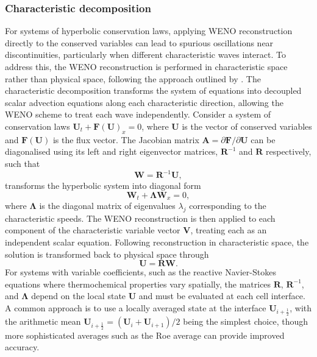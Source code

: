 \subsubsection{Characteristic decomposition}

For systems of hyperbolic conservation laws, applying WENO reconstruction directly to the conserved variables can lead to spurious oscillations near discontinuities, particularly when different characteristic waves interact. To address this, the WENO reconstruction is performed in characteristic space rather than physical space, following the approach outlined by \citet{JiangShu1996}. The characteristic decomposition transforms the system of equations into decoupled scalar advection equations along each characteristic direction, allowing the WENO scheme to treat each wave independently. Consider a system of conservation laws $\mathbf{U}_t + \mathbf{F}(\mathbf{U})_x = 0$, where $\mathbf{U}$ is the vector of conserved variables and $\mathbf{F}(\mathbf{U})$ is the flux vector. The Jacobian matrix $\mathbf{A} = \partial \mathbf{F}/\partial \mathbf{U}$ can be diagonalised using its left and right eigenvector matrices, $\mathbf{R}^{-1}$ and $\mathbf{R}$ respectively, such that
\begin{equation}
\mathbf{W} = \mathbf{R}^{-1}\mathbf{U},
\end{equation}
transforms the hyperbolic system into diagonal form
\begin{equation}
\mathbf{W}_t + \mathbf{\Lambda}\mathbf{W}_x = 0,
\end{equation}
where $\mathbf{\Lambda}$ is the diagonal matrix of eigenvalues $\lambda_j$ corresponding to the characteristic speeds. The WENO reconstruction is then applied to each component of the characteristic variable vector $\mathbf{V}$, treating each as an independent scalar equation. Following reconstruction in characteristic space, the solution is transformed back to physical space through
\begin{equation}
\mathbf{U} = \mathbf{R}\mathbf{W}.
\end{equation}
For systems with variable coefficients, such as the reactive Navier-Stokes equations where thermochemical properties vary spatially, the matrices $\mathbf{R}$, $\mathbf{R}^{-1}$, and $\mathbf{\Lambda}$ depend on the local state $\mathbf{U}$ and must be evaluated at each cell interface. A common approach is to use a locally averaged state at the interface $\mathbf{U}_{i+\frac{1}{2}}$, with the arithmetic mean $\mathbf{U}_{i+\frac{1}{2}} = (\mathbf{U}_i + \mathbf{U}_{i+1})/2$ being the simplest choice, though more sophisticated averages such as the Roe average can provide improved accuracy.

